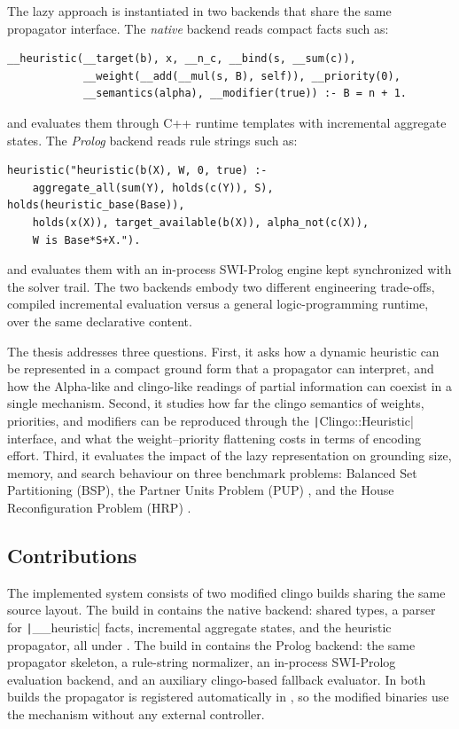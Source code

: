 The lazy approach is instantiated in two backends that share the same propagator interface. The \emph{native} backend reads compact facts such as:

\begin{verbatim}
__heuristic(__target(b), x, __n_c, __bind(s, __sum(c)),
            __weight(__add(__mul(s, B), self)), __priority(0),
            __semantics(alpha), __modifier(true)) :- B = n + 1.
\end{verbatim}

and evaluates them through C++ runtime templates with incremental aggregate states. The \emph{Prolog} backend reads rule strings such as:

\begin{verbatim}
heuristic("heuristic(b(X), W, 0, true) :-
    aggregate_all(sum(Y), holds(c(Y)), S), holds(heuristic_base(Base)),
    holds(x(X)), target_available(b(X)), alpha_not(c(X)),
    W is Base*S+X.").
\end{verbatim}

and evaluates them with an in-process SWI-Prolog engine \cite{wielemaker2012swipl} kept synchronized with the solver trail. The two backends embody two different engineering trade-offs, compiled incremental evaluation versus a general logic-programming runtime, over the same declarative content.

The thesis addresses three questions. First, it asks how a dynamic heuristic can be represented in a compact ground form that a propagator can interpret, and how the Alpha-like and clingo-like readings of partial information can coexist in a single mechanism. Second, it studies how far the clingo semantics of weights, priorities, and modifiers can be reproduced through the \texttt|Clingo::Heuristic| interface, and what the weight--priority flattening costs in terms of encoding effort. Third, it evaluates the impact of the lazy representation on grounding size, memory, and search behaviour on three benchmark problems: Balanced Set Partitioning (BSP), the Partner Units Problem (PUP) \cite{comploi2023dynamicAggregates}, and the House Reconfiguration Problem (HRP) \cite{comploi2023domain}.

\subsection{Contributions}

The implemented system consists of two modified clingo builds sharing the same source layout. The build in  contains the native backend: shared types, a parser for \texttt|__heuristic| facts, incremental aggregate states, and the heuristic propagator, all under . The build in  contains the Prolog backend: the same propagator skeleton, a rule-string normalizer, an in-process SWI-Prolog evaluation backend, and an auxiliary clingo-based fallback evaluator. In both builds the propagator is registered automatically in , so the modified binaries use the mechanism without any external controller.

